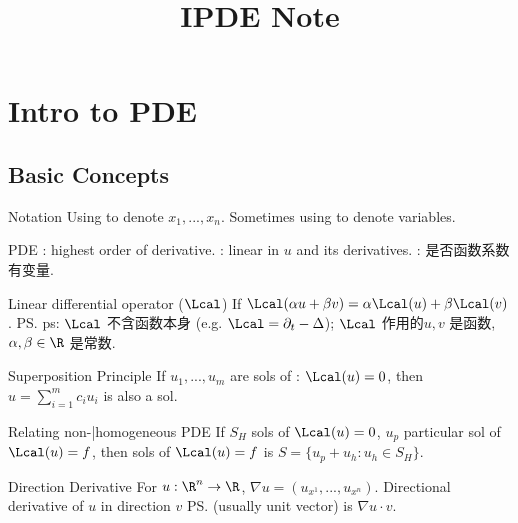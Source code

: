 \documentclass{note}
\title{IPDE Note}
\author{}
\begin{document}
\maketitle
\thispagestyle{fancy}

\section{Intro to PDE}

\subsection{Basic Concepts}

\begin{MyTh}{Notation}
    Using  to denote $x_1,...,x_n$. Sometimes using  to denote variables.
    \quad {}
\end{MyTh}

\begin{MyTh}{PDE}
    : highest order of derivative. \quad {}: linear in $u$ and its derivatives. \quad {}: {\footnotesize 是否函数系数有变量.}
\end{MyTh}

\begin{MyTh}{Linear differential operator ($\Lcal$)}
    If $\Lcal(\alpha u+\beta v)=\alpha \Lcal(u)+\beta \Lcal(v)$. \quad \ps{ps: $\Lcal$ 不含函数本身 (e.g. $\Lcal = \partial_t - \Delta$); $\Lcal$ 作用的$u,v$ 是函数, $\alpha,\beta\in\R$ 是常数.}
\end{MyTh}

\begin{MyTh}{Superposition Principle}
    If $u_1,...,u_m$ are sols of : $\Lcal(u)=0$, then $u=\sum_{i=1}^m c_i u_i$ is also a sol.
\end{MyTh}

\begin{MyTh}{Relating non-|homogeneous PDE}
    \small If $S_H$ sols of $\Lcal(u)=0$, $u_p$ particular sol of $\Lcal(u)=f$, then sols of $\Lcal(u)=f$ is $S=\{u_p+u_h:u_h\in S_H\}$.
\end{MyTh}

\begin{MyTh}{Direction Derivative}
    For $u:\R^n\to\R$, $\nabla u=(u_{x^1},...,u_{x^n})$. \quad Directional derivative of $u$ in direction $v$ \ps{(usually unit vector)} is $\nabla u\cdot v$.
\end{MyTh}
\end{document}
